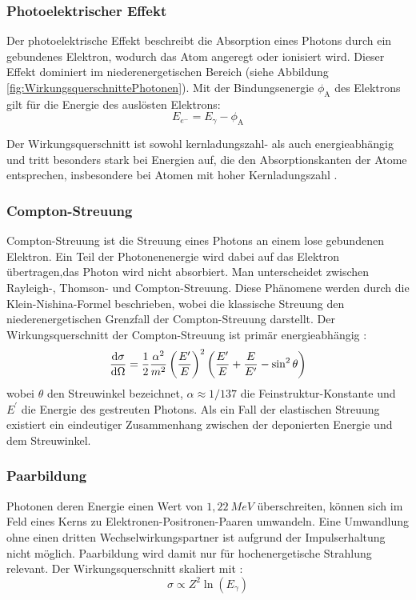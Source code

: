 		\subsubsection{Photoelektrischer Effekt}
		Der photoelektrische Effekt beschreibt die Absorption eines Photons durch ein gebundenes Elektron, wodurch das Atom angeregt oder ionisiert wird. Dieser Effekt dominiert im niederenergetischen Bereich (siehe Abbildung \ref{fig:WirkungsquerschnittePhotonen}). Mit der Bindungsenergie $\phi_{\text{A}}$ des Elektrons gilt für die Energie des auslösten Elektrons:
		\begin{equation*}
			E_{e^{-}}= E_{\gamma}-\phi_{\text{A}}
		\end{equation*} 
		
		\noindent Der Wirkungsquerschnitt ist sowohl kernladungszahl- als auch energieabhängig und tritt besonders stark bei Energien auf, die den Absorptionskanten der Atome entsprechen, insbesondere bei Atomen mit hoher Kernladungszahl  \cite{Leo}.
		
		
		\subsubsection{Compton-Streuung}
		Compton-Streuung ist die Streuung eines Photons an einem lose gebundenen Elektron. Ein Teil der Photonenenergie wird dabei auf das Elektron übertragen,das Photon wird nicht absorbiert. Man unterscheidet zwischen Rayleigh-, Thomson- und Compton-Streuung. Diese Phänomene werden durch die Klein-Nishina-Formel beschrieben, wobei die klassische Streuung den niederenergetischen Grenzfall der Compton-Streuung darstellt. Der Wirkungsquerschnitt der Compton-Streuung ist primär energieabhängig  \cite{Leo}:
		\begin{equation*}
			{\displaystyle \dv{\sigma}{\Omega}={\frac {1}{2}}{\frac {\alpha ^{2}}{m^{2}}}\left({\frac {E'}{E}}\right)^{2}\left({\frac {E'}{E}}+{\frac {E}{E'}}-\sin ^{2}\theta \right)}
		\end{equation*}
		wobei $\theta$ den Streuwinkel bezeichnet, $\alpha\approx 1/137$ die Feinstruktur-Konstante und $E^{\prime}$ die Energie des gestreuten Photons. Als ein Fall der elastischen Streuung existiert ein eindeutiger Zusammenhang zwischen der deponierten Energie und dem Streuwinkel.
		
		\subsubsection{Paarbildung}
		Photonen deren Energie einen Wert von $1,22\ \si{MeV}$ überschreiten, können sich im Feld eines Kerns zu Elektronen-Positronen-Paaren umwandeln. Eine Umwandlung ohne einen dritten Wechselwirkungspartner ist aufgrund der Impulserhaltung nicht möglich. Paarbildung wird damit nur für hochenergetische Strahlung relevant. Der Wirkungsquerschnitt skaliert mit \cite{DemtroderKerne}:
		\begin{equation*}
			\sigma \propto Z^{2}\ln(E_{\gamma})
		\end{equation*} 
		
